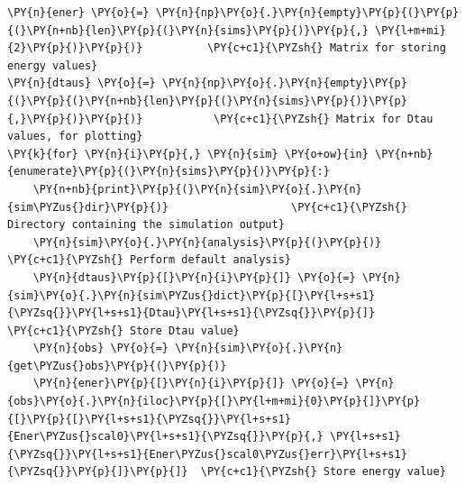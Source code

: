     \begin{tcolorbox}[breakable, size=fbox, boxrule=1pt, pad at break*=1mm,colback=cellbackground, colframe=cellborder]
\begin{Verbatim}[commandchars=\\\{\}]
\PY{n}{ener} \PY{o}{=} \PY{n}{np}\PY{o}{.}\PY{n}{empty}\PY{p}{(}\PY{p}{(}\PY{n+nb}{len}\PY{p}{(}\PY{n}{sims}\PY{p}{)}\PY{p}{,} \PY{l+m+mi}{2}\PY{p}{)}\PY{p}{)}          \PY{c+c1}{\PYZsh{} Matrix for storing energy values}
\PY{n}{dtaus} \PY{o}{=} \PY{n}{np}\PY{o}{.}\PY{n}{empty}\PY{p}{(}\PY{p}{(}\PY{n+nb}{len}\PY{p}{(}\PY{n}{sims}\PY{p}{)}\PY{p}{,}\PY{p}{)}\PY{p}{)}           \PY{c+c1}{\PYZsh{} Matrix for Dtau values, for plotting}
\PY{k}{for} \PY{n}{i}\PY{p}{,} \PY{n}{sim} \PY{o+ow}{in} \PY{n+nb}{enumerate}\PY{p}{(}\PY{n}{sims}\PY{p}{)}\PY{p}{:}
    \PY{n+nb}{print}\PY{p}{(}\PY{n}{sim}\PY{o}{.}\PY{n}{sim\PYZus{}dir}\PY{p}{)}                   \PY{c+c1}{\PYZsh{} Directory containing the simulation output}
    \PY{n}{sim}\PY{o}{.}\PY{n}{analysis}\PY{p}{(}\PY{p}{)}                       \PY{c+c1}{\PYZsh{} Perform default analysis}
    \PY{n}{dtaus}\PY{p}{[}\PY{n}{i}\PY{p}{]} \PY{o}{=} \PY{n}{sim}\PY{o}{.}\PY{n}{sim\PYZus{}dict}\PY{p}{[}\PY{l+s+s1}{\PYZsq{}}\PY{l+s+s1}{Dtau}\PY{l+s+s1}{\PYZsq{}}\PY{p}{]}      \PY{c+c1}{\PYZsh{} Store Dtau value}
    \PY{n}{obs} \PY{o}{=} \PY{n}{sim}\PY{o}{.}\PY{n}{get\PYZus{}obs}\PY{p}{(}\PY{p}{)}
    \PY{n}{ener}\PY{p}{[}\PY{n}{i}\PY{p}{]} \PY{o}{=} \PY{n}{obs}\PY{o}{.}\PY{n}{iloc}\PY{p}{[}\PY{l+m+mi}{0}\PY{p}{]}\PY{p}{[}\PY{p}{[}\PY{l+s+s1}{\PYZsq{}}\PY{l+s+s1}{Ener\PYZus{}scal0}\PY{l+s+s1}{\PYZsq{}}\PY{p}{,} \PY{l+s+s1}{\PYZsq{}}\PY{l+s+s1}{Ener\PYZus{}scal0\PYZus{}err}\PY{l+s+s1}{\PYZsq{}}\PY{p}{]}\PY{p}{]}  \PY{c+c1}{\PYZsh{} Store energy value}
\end{Verbatim}
\end{tcolorbox}

